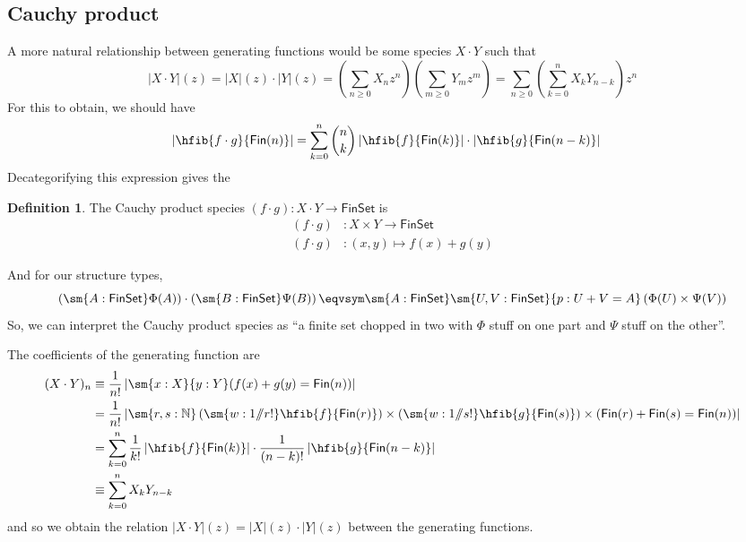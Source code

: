 \documentclass[fleqn]{article}
\newcommand{\gf}[1]{\abs{#1}\!(z)}
\newcommand{\fin}{\mathsf{Fin}}
\newcommand{\finset}{\mathsf{FinSet}}
\newcommand{\abs}[1]{\left\lvert #1 \right\rvert}
\newcommand{\sslash}{/\!\!/}
\theoremstyle{theorem}
\theoremstyle{definition}
\newtheorem{defn}{Definition}[section]
\begin{document}
\subsection{Cauchy product}
A more natural relationship between generating functions would be some species
$X \cdot Y$ such that
\[
  \gf{X \cdot Y}
  =
  \gf{X} \cdot \gf{Y}
  =
  \left(\sum_{n\geq0} X_{n} z^{n}\right)
  \left(\sum_{m\geq0} Y_{m} z^{m}\right)
  =
  \sum_{n\geq0}
  \left(
    \sum_{k=0}^{n} X_{k}Y_{n-k}
  \right) z^{n} 
\]
For this to obtain, we should have
\begin{align*}
  \abs{\hfib{f \cdot g}{\fin(n)}}
  &=
  \sum_{k=0}^{n}
  \binom{n}{k}
    \abs{\hfib{f}{\fin(k)}}
    \cdot
    \abs{\hfib{g}{\fin(n-k)}}
\end{align*}
Decategorifying this expression gives the
\begin{defn}
  The Cauchy product species $(f \cdot g) : X \cdot Y \to \finset$ is
  \begin{align*}
    (f \cdot g) &: X \times Y \to \finset \\
    (f \cdot g) &: (x, y) \mapsto f(x) + g(y)
  \end{align*}
\end{defn}
\noindent
And for our structure types,
\[
  \left(\sm{A : \finset}\Phi(A)\right) 
  \cdot
  \left(\sm{B : \finset}\Psi(B)\right)
  \eqvsym
  \sm{A : \finset}\sm{U, V : \finset}{p : U + V = A} \left(
    \Phi(U) \times \Psi(V)
  \right)
\]
So, we can interpret the Cauchy product species as ``a finite set chopped in
two with $\Phi$ stuff on one part and $\Psi$ stuff on the other''.

The coefficients of the generating function are
\begin{align*}
  (X \cdot Y)_{n}
  &\equiv
  \frac{1}{n!}
  \abs{\sm{x:X}{y:Y}(f(x) + g(y) = \fin(n))}
  \\&=
  \frac{1}{n!}
  \abs{\sm{r, s : \mathbb{N}}
    \left(\sm{w : 1\sslash r!}\hfib{f}{\fin(r)}\right)
    \times 
    \left(\sm{w : 1\sslash s!}\hfib{g}{\fin(s)}\right)
    \times
    (\fin(r) + \fin(s) = \fin(n))
    }
  \\&=
  \sum_{k=0}^{n}\frac{1}{k!}\abs{\hfib{f}{\fin(k)}} 
    \cdot \frac{1}{(n-k)!}\abs{\hfib{g}{\fin(n-k)}}
  \\&\equiv
  \sum_{k=0}^{n}X_{k}Y_{n-k}
\end{align*}
and so we obtain the relation $\gf{X \cdot Y} = \gf{X} \cdot \gf{Y}$ between
the generating functions.
\end{document}
